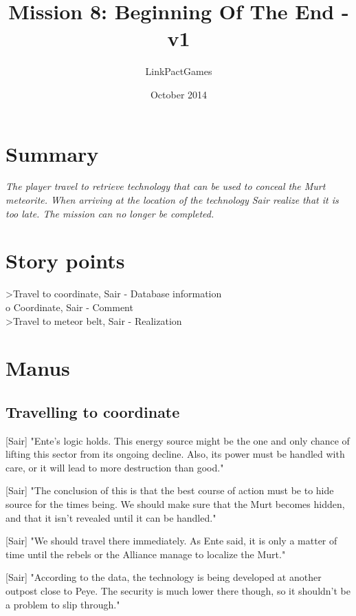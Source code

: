 \documentclass[a4paper,12pt]{article}
\begin{document}
\title{Mission 8: Beginning Of The End - v1}
\author{LinkPactGames}
\date{October 2014}
\maketitle

\section{Summary}

\textit{The player travel to retrieve technology that can be used to conceal the Murt meteorite.
When arriving at the location of the technology Sair realize that it is too late. The mission can no
longer be completed.}

\section{Story points}

\textgreater Travel to coordinate, Sair - Database information\\
o Coordinate, Sair - Comment\\
\textgreater Travel to meteor belt, Sair - Realization

\section{Manus}

\subsection{Travelling to coordinate}

[Sair] "Ente's logic holds. This energy source might be the one and only chance of lifting this sector from
its ongoing decline. Also, its power must be handled with care, or it will lead to more destruction than good."

[Sair] "The conclusion of this is that the best course of action must be to hide source for the times being. We should make sure that
the Murt becomes hidden, and that it isn't revealed until it can be handled."

[Sair] "We should travel there immediately. As Ente said, it is only a matter of time until the rebels or the Alliance manage to localize the Murt."

[Sair] "According to the data, the technology is being developed at another outpost close to Peye. The security is much lower there though,
so it shouldn't be a problem to slip through."
\end{document}
